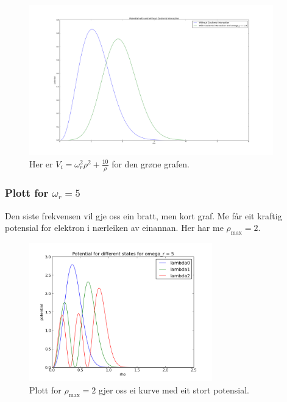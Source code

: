\documentclass[11pt, a4paper]{article}
\begin{document}
      \begin{figure}[H]
        \centering
        \includegraphics[width=400px]{omega1to10.png}
        \caption{Her er $V_i = \omega_r^2\rho^2 + \frac{10}{\rho}$ for den grøne grafen.}
      \end{figure}

    \subsubsection{Plott for $\omega_r = 5$}
      Den siste frekvensen vil gje oss ein bratt, men kort graf. Me får eit kraftig potensial for elektron i nærleiken av einannan. Her har me $\rho_{\text{max}} = 2$.
      \begin{figure}[H]
        \centering
        \includegraphics[width=300px]{omega5.png}
        \caption{Plott for $\rho_{\text{max}} = 2$ gjer oss ei kurve med eit stort potensial.}
      \end{figure}
\end{document}
